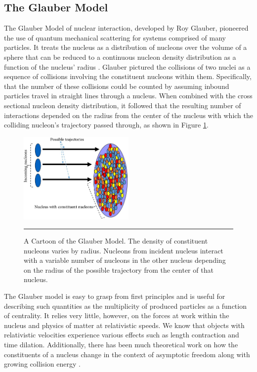 \subsection{The Glauber Model}
\label{sect:glauber}
The Glauber Model of nuclear interaction, developed by Roy Glauber, pioneered the use of quantum mechanical scattering for systems comprised of many particles. It treats the nucleus as a distribution of nucleons over the volume of a sphere that can be reduced to a continuous nucleon density distribution as a function of the nucleus' radius \citep{Miller:2007ri}. Glauber pictured the collisions of two nuclei as a sequence of collisions involving the constituent nucleons within them. Specifically, that the number of these collisions could be counted by assuming inbound particles travel in straight lines through a nucleus. When combined with the cross sectional nucleon density distribution, it followed that the resulting number of interactions depended on the radius from the center of the nucleus with which the colliding nucleon's trajectory passed through, as shown in Figure \ref{fig:glaubermodel}.
\begin{figure}[b!]
  \centering

    \includegraphics[width=0.5\textwidth]{Figures/glauberpic.jpg}
    \rule{35em}{0.5pt}
  \caption[A cartoon of the Glauber Model]{A Cartoon of the Glauber Model. The density of constituent nucleons varies by radius. Nucleons from incident nucleus interact with a variable number of nucleons in the other nucleus depending on the radius of the possible trajectory from the center of that nucleus. \citep{Nagle:2006}}
  \label{fig:glaubermodel}

\end{figure}

The Glauber model is easy to grasp from first principles and is useful for describing such quantities as the multiplicity of produced particles as a function of centrality. It relies very little, however, on the forces at work within the nucleus and physics of matter at relativistic speeds. We know that objects with relativistic velocities experience various effects such as length contraction and time dilation. Additionally, there has been much theoretical work on how the constituents of a nucleus change in the context of asymptotic freedom along with growing collision energy \citep{PhysRevD.10.1649}.

